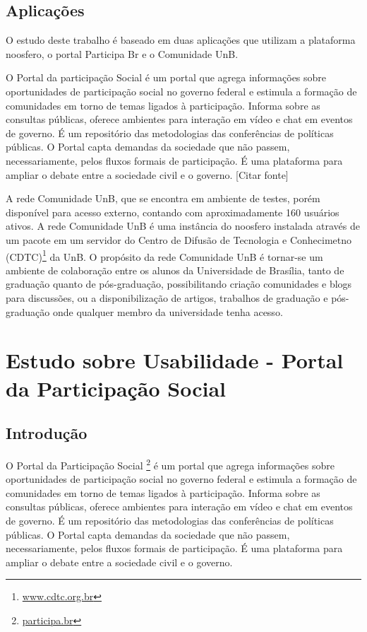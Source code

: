 \subsection {Aplicações}

O estudo deste trabalho é baseado em duas aplicações que utilizam a plataforma noosfero, o portal Participa Br e o Comunidade UnB.

O Portal da participação Social é um portal que agrega informações sobre oportunidades de participação social no governo federal e estimula a formação de comunidades em torno de temas ligados à participação. Informa sobre as consultas públicas, oferece ambientes para interação em vídeo e chat em eventos de governo. É um repositório das metodologias das conferências de políticas públicas. O Portal capta demandas da sociedade que não passem, necessariamente, pelos fluxos formais de participação. É uma plataforma para ampliar o debate entre a sociedade civil e o governo. [Citar fonte]

A rede Comunidade UnB, que se encontra em ambiente de testes, porém disponível para acesso externo, contando com aproximadamente 160 usuários ativos. A rede Comunidade UnB é uma instância do noosfero instalada através de um pacote em um servidor do Centro de Difusão de Tecnologia e Conhecimetno (CDTC)\footnote{\url{www.cdtc.org.br}} da UnB. O propósito da rede Comunidade UnB é tornar-se um ambiente de colaboração entre os alunos da Universidade de Brasília, tanto de graduação quanto de pós-graduação, possibilitando criação comunidades e blogs para discussões, ou a disponibilização de artigos, trabalhos de graduação e pós-graduação onde qualquer membro da universidade tenha acesso.

\section {Estudo sobre Usabilidade - Portal da Participação Social}

\subsection{Introdução}

O Portal da Participação Social \footnote{\url{participa.br}} é um portal que agrega informações sobre oportunidades de participação social no governo federal e estimula a formação de comunidades em torno de temas ligados à participação. Informa sobre as consultas públicas, oferece ambientes para interação em vídeo e chat em eventos de governo. É um repositório das metodologias das conferências de políticas públicas. O Portal capta demandas da sociedade que não passem, necessariamente, pelos fluxos formais de participação. É uma plataforma para ampliar o debate entre a sociedade civil e o governo. %

